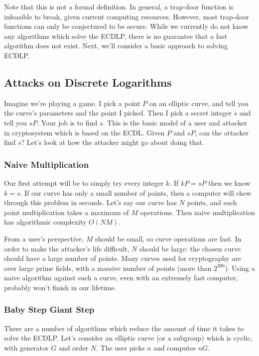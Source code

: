 \documentclass{article}
\begin{document}
Note that this is not a formal definition.
In general, a trap-door function is infeasible to break, given current computing resources.
However, most trap-door functions can only be conjectured to be secure.
While we currently do not know any algorithms which solve the ECDLP, there is no guarantee that a fast algorithm does not exist.
Next, we'll consider a basic approach to solving ECDLP.

\subsection{Attacks on Discrete Logarithms}
Imagine we're playing a game.
I pick a point $P$ on an elliptic curve, and tell you the curve's parameters and the point I picked.
Then I pick a secret integer $s$ and tell you $sP$. Your job is to find $s$.
This is the basic model of a user and attacker in cryptosystem which is based on the ECDL.
Given $P$ and $sP$, can the attacker find $s$? Let's look at how the attacker might go about doing that.

\subsubsection{Naive Multiplication}
Our first attempt will be to simply try every integer $k$.
If $kP = sP$ then we know $k = s$.
If our curve has only a small number of points, then a computer will chew through this problem in seconds.
Let's say our curve has $N$ points, and each point multiplication takes a maximum of $M$ operations.
Then naive multiplication has algorithmic complexity $O(NM)$.

From a user's perspective, $M$ should be small, so curve operations are fast.
In order to make the attacker's life difficult, $N$ should be large: the chosen curve should have a large number of points.
Many curves used for cryptography are over large prime fields, with a massive number of points (more than $2^200$).
Using a naive algorithm against such a curve, even with an extremely fast computer, probably won't finish in our lifetime.

\subsubsection{Baby Step Giant Step}
There are a number of algorithms which reduce the amount of time it takes to solve the ECDLP.
Let's consider an elliptic curve (or a subgroup) which is cyclic, with generator $G$ and order $N$.
The user picks $n$ and computes $nG$. 
\end{document}
